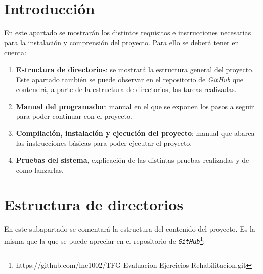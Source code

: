 
\section{Introducción}
En este apartado se mostrarán los distintos requisitos e instrucciones necesarias para la instalación y comprensión del proyecto. Para ello se deberá tener en cuenta:
\begin{enumerate}
    \item \textbf{Estructura de directorios}: se mostrará la estructura general del proyecto. Este apartado también se puede observar en el repositorio de  \textit{GitHub} que contendrá, a parte de la estructura de directorios, las tareas realizadas. 
    \item \textbf{Manual del programador}: manual en el que se exponen los pasos a seguir para poder continuar con el proyecto. 
    \item \textbf{Compilación, instalación y ejecución del proyecto}: manual que abarca las instrucciones básicas para poder ejecutar el proyecto.  
    \item \textbf{Pruebas del sistema}, explicación de las distintas pruebas realizadas y de como lanzarlas.
\end{enumerate}

\section{Estructura de directorios}
En este subapartado se comentará la estructura del contenido del proyecto. Es la misma que la que se puede apreciar en el repositorio de \texttt{\textit{GitHub}}\footnote{https://github.com/lnc1002/TFG-Evaluacion-Ejercicios-Rehabilitacion.git}:


